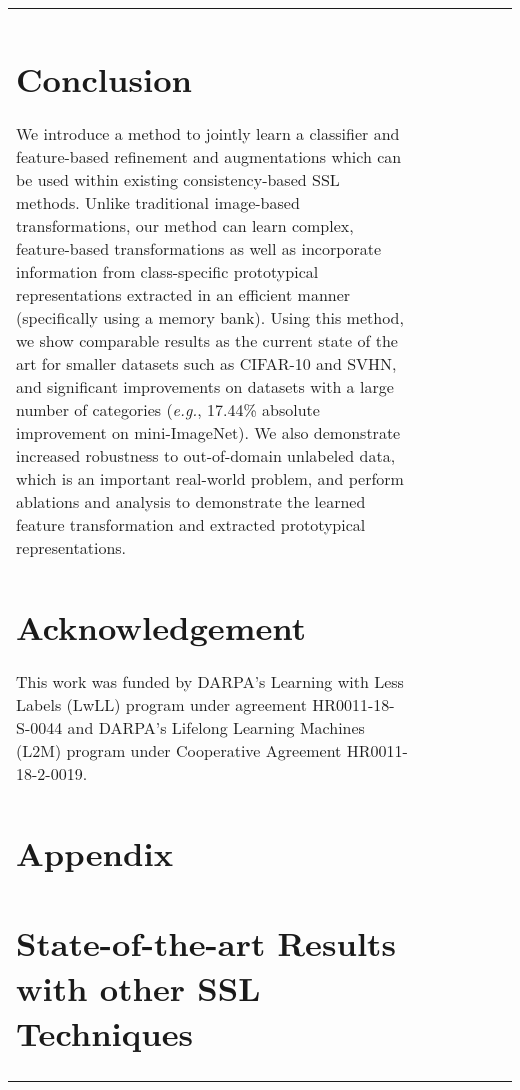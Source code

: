 \documentclass[runningheads]{llncs}
\begin{document}
\begin{table*}[t]
{\begin{tabular}{@{\extracolsep{4pt}}lcccccc@{}}
{ \section{Conclusion}
We introduce a method to jointly learn a classifier and feature-based refinement and augmentations which can be used within existing consistency-based SSL methods. Unlike traditional image-based transformations, our method can learn complex, feature-based transformations as well as incorporate information from class-specific prototypical representations extracted in an efficient manner (specifically using a memory bank). Using this method, we show comparable results as the current state of the art for smaller datasets such as CIFAR-10 and SVHN, and significant improvements on datasets with a large number of categories (\textit{e.g.}, 17.44\% absolute improvement on mini-ImageNet). We also demonstrate increased robustness to out-of-domain unlabeled data, which is an important real-world problem, and perform ablations and analysis to demonstrate the learned feature transformation and extracted prototypical representations.




\section{Acknowledgement}
This work was funded by DARPA's Learning with Less Labels (LwLL) program under agreement HR0011-18-S-0044 and DARPA’s Lifelong Learning Machines (L2M) program under Cooperative Agreement HR0011-18-2-0019. 
\clearpage



\section*{Appendix}
\appendix

\renewcommand{\thesection}{\Alph{section}}

\section{State-of-the-art Results with other SSL Techniques}

}
\end{tabular}}
\end{table*}
\end{document}
